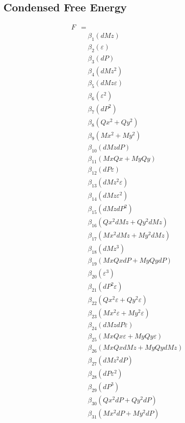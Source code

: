 \documentclass{article}
\begin{document}
\subsection*{Condensed Free Energy}

\begin{align*}
F &= \\
&\quad \beta_{1} \left(dMz\right) \\
&\quad \beta_{2} \left(ε\right) \\
&\quad \beta_{3} \left(dP\right) \\
&\quad \beta_{4} \left(dMz^{2}\right) \\
&\quad \beta_{5} \left(dMz ε\right) \\
&\quad \beta_{6} \left(ε^{2}\right) \\
&\quad \beta_{7} \left(dP^{2}\right) \\
&\quad \beta_{8} \left(Qx^{2} + Qy^{2}\right) \\
&\quad \beta_{9} \left(Mx^{2} + My^{2}\right) \\
&\quad \beta_{10} \left(dMz dP\right) \\
&\quad \beta_{11} \left(Mx Qx + My Qy\right) \\
&\quad \beta_{12} \left(dP ε\right) \\
&\quad \beta_{13} \left(dMz^{2} ε\right) \\
&\quad \beta_{14} \left(dMz ε^{2}\right) \\
&\quad \beta_{15} \left(dMz dP^{2}\right) \\
&\quad \beta_{16} \left(Qx^{2} dMz + Qy^{2} dMz\right) \\
&\quad \beta_{17} \left(Mx^{2} dMz + My^{2} dMz\right) \\
&\quad \beta_{18} \left(dMz^{3}\right) \\
&\quad \beta_{19} \left(Mx Qx dP + My Qy dP\right) \\
&\quad \beta_{20} \left(ε^{3}\right) \\
&\quad \beta_{21} \left(dP^{2} ε\right) \\
&\quad \beta_{22} \left(Qx^{2} ε + Qy^{2} ε\right) \\
&\quad \beta_{23} \left(Mx^{2} ε + My^{2} ε\right) \\
&\quad \beta_{24} \left(dMz dP ε\right) \\
&\quad \beta_{25} \left(Mx Qx ε + My Qy ε\right) \\
&\quad \beta_{26} \left(Mx Qx dMz + My Qy dMz\right) \\
&\quad \beta_{27} \left(dMz^{2} dP\right) \\
&\quad \beta_{28} \left(dP ε^{2}\right) \\
&\quad \beta_{29} \left(dP^{3}\right) \\
&\quad \beta_{30} \left(Qx^{2} dP + Qy^{2} dP\right) \\
&\quad \beta_{31} \left(Mx^{2} dP + My^{2} dP\right)
\end{align*}
\end{document}
